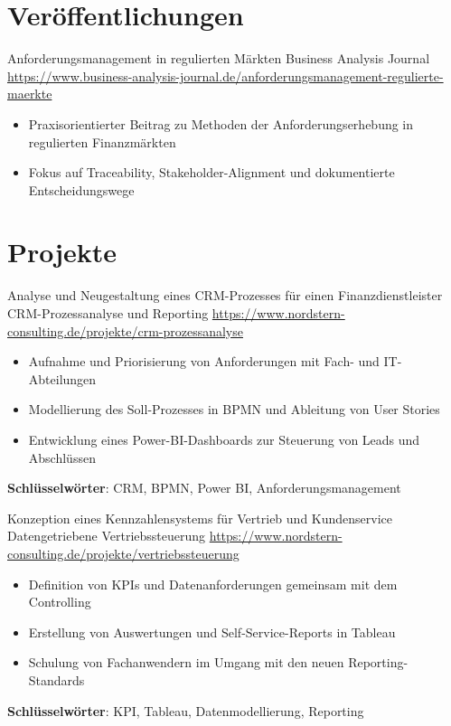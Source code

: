\documentclass[a4paper, serif, 10pt]{moderncv}
\begin{document}
\section{Veröffentlichungen}

        {Anforderungsmanagement in regulierten Märkten}
        {Business Analysis Journal}
        {\url{https://www.business-analysis-journal.de/anforderungsmanagement-regulierte-maerkte}}
        {}
        {\begin{itemize}
\item Praxisorientierter Beitrag zu Methoden der Anforderungserhebung in regulierten Finanzmärkten
\item Fokus auf Traceability, Stakeholder-Alignment und dokumentierte Entscheidungswege
\end{itemize}}
\section{Projekte}

        {Analyse und Neugestaltung eines CRM-Prozesses für einen Finanzdienstleister}
        {CRM-Prozessanalyse und Reporting}
        {\url{https://www.nordstern-consulting.de/projekte/crm-prozessanalyse}}
        {}
        {\begin{itemize}
\item Aufnahme und Priorisierung von Anforderungen mit Fach- und IT-Abteilungen
\item Modellierung des Soll-Prozesses in BPMN und Ableitung von User Stories
\item Entwicklung eines Power-BI-Dashboards zur Steuerung von Leads und Abschlüssen
\end{itemize}
\textbf{Schlüsselwörter}: CRM, BPMN, Power BI, Anforderungsmanagement}

        {Konzeption eines Kennzahlensystems für Vertrieb und Kundenservice}
        {Datengetriebene Vertriebssteuerung}
        {\url{https://www.nordstern-consulting.de/projekte/vertriebssteuerung}}
        {}
        {\begin{itemize}
\item Definition von KPIs und Datenanforderungen gemeinsam mit dem Controlling
\item Erstellung von Auswertungen und Self-Service-Reports in Tableau
\item Schulung von Fachanwendern im Umgang mit den neuen Reporting-Standards
\end{itemize}
\textbf{Schlüsselwörter}: KPI, Tableau, Datenmodellierung, Reporting}
\end{document}
